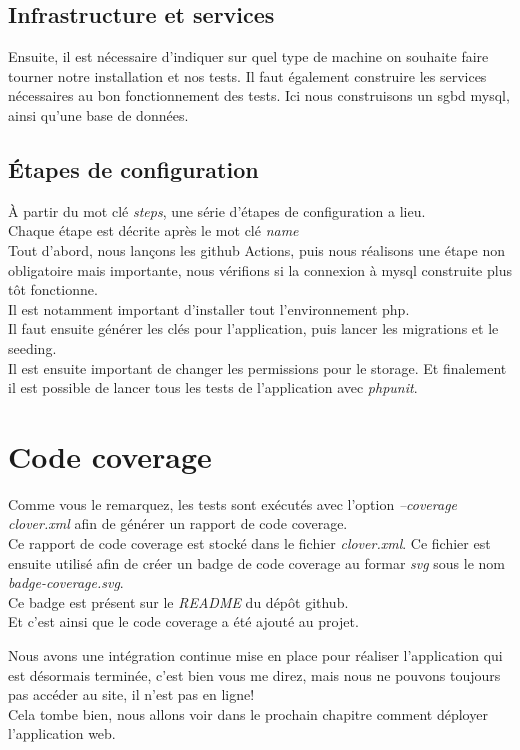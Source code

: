 \documentclass[
    iai, %
    il, %
]{heig-tb}
\begin{document}
\subsection{Infrastructure et services}
Ensuite, il est nécessaire d'indiquer sur quel type de machine on souhaite faire tourner notre
installation et nos tests. Il faut également construire les services nécessaires au bon
fonctionnement des tests. Ici nous construisons un \Gls{sgbd} \Gls{mysql}, ainsi qu'une base de données.

\subsection{Étapes de configuration}

À partir du mot clé \emph{steps}, une série d'étapes de configuration a lieu. \\
Chaque étape est décrite après le mot clé \emph{name}\\
Tout d'abord, nous lançons les \Gls{github} Actions, puis nous réalisons une étape non obligatoire mais
importante, nous vérifions si la connexion à \Gls{mysql} construite plus tôt fonctionne.\\
Il est notamment important d'installer tout l'environnement \Gls{php}.\\
Il faut ensuite générer les clés pour l'application, puis lancer les migrations et le
seeding.\\
Il est ensuite important de changer les permissions pour le storage. Et finalement il est possible
de lancer tous les tests de l'application avec \emph{phpunit}. \\

\section{Code coverage}
Comme vous le remarquez, les tests sont exécutés avec l'option \emph{--coverage clover.xml} afin de générer un rapport de code coverage. \\
Ce rapport de code coverage est stocké dans le fichier \emph{clover.xml}. Ce fichier est ensuite utilisé afin de créer un badge de code coverage au formar \emph{svg} sous le nom \emph{badge-coverage.svg}. \\
Ce badge est présent sur le \emph{README} du dépôt \Gls{github}. \\
Et c'est ainsi que le code coverage a été ajouté au projet.

Nous avons une intégration continue mise en place pour réaliser l'application qui est désormais terminée, c'est bien vous me direz, mais nous ne pouvons toujours pas accéder au site, il n'est pas en ligne! \\
Cela tombe bien, nous allons voir dans le prochain chapitre comment déployer l'application web.
\end{document}
